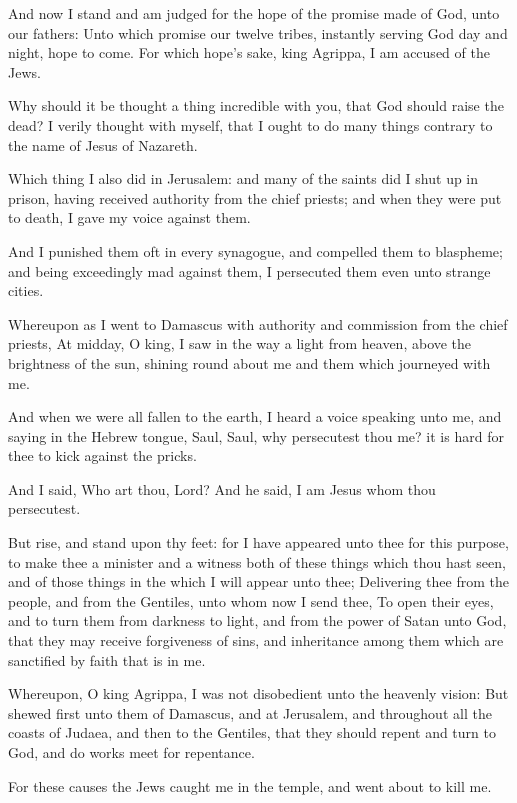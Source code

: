 \verse And now I stand and am judged for the hope of the promise made of God, unto our fathers: \verse Unto which promise our twelve tribes, instantly serving God day and night, hope to come. For which hope's sake, king Agrippa, I am accused of the Jews.

\verse Why should it be thought a thing incredible with you, that God should raise the dead?  \verse I verily thought with myself, that I ought to do many things contrary to the name of Jesus of Nazareth.

\verse Which thing I also did in Jerusalem: and many of the saints did I shut up in prison, having received authority from the chief priests; and when they were put to death, I gave my voice against them.

\verse And I punished them oft in every synagogue, and compelled them to blaspheme; and being exceedingly mad against them, I persecuted them even unto strange cities.

\verse Whereupon as I went to Damascus with authority and commission from the chief priests, \verse At midday, O king, I saw in the way a light from heaven, above the brightness of the sun, shining round about me and them which journeyed with me.

\verse And when we were all fallen to the earth, I heard a voice speaking unto me, and saying in the Hebrew tongue, Saul, Saul, why persecutest thou me? it is hard for thee to kick against the pricks.

\verse And I said, Who art thou, Lord? And he said, I am Jesus whom thou persecutest.

\verse But rise, and stand upon thy feet: for I have appeared unto thee for this purpose, to make thee a minister and a witness both of these things which thou hast seen, and of those things in the which I will appear unto thee; \verse Delivering thee from the people, and from the Gentiles, unto whom now I send thee, \verse To open their eyes, and to turn them from darkness to light, and from the power of Satan unto God, that they may receive forgiveness of sins, and inheritance among them which are sanctified by faith that is in me.

\verse Whereupon, O king Agrippa, I was not disobedient unto the heavenly vision: \verse But shewed first unto them of Damascus, and at Jerusalem, and throughout all the coasts of Judaea, and then to the Gentiles, that they should repent and turn to God, and do works meet for repentance.

\verse For these causes the Jews caught me in the temple, and went about to kill me.

